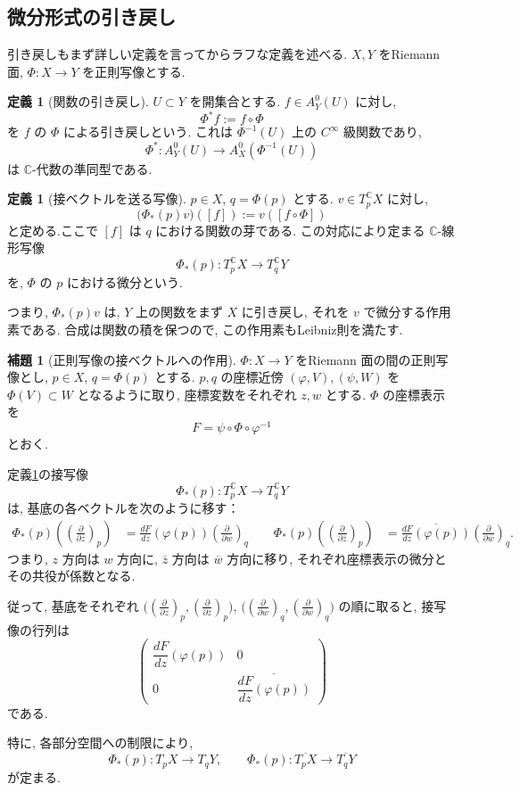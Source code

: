 \documentclass[dvipdfmx,a4paper,11pt]{article} %
\newcommand{\C}{\mathbb{C}}
\theoremstyle{definition}
\numberwithin{equation}{section}
\newtheorem{lem}[thm]{補題}
\newtheorem{dfn}[thm]{定義}
\begin{document}
\subsection{微分形式の引き戻し}\label{O-S022}

引き戻しもまず詳しい定義を言ってからラフな定義を述べる. 
$X,Y$ をRiemann 面, $\Phi:X\to Y$ を正則写像とする.

\begin{dfn}[関数の引き戻し]
$U\subset Y$ を開集合とする.
$f\in A_Y^0(U)$ に対し, 
\[
\Phi^*f:=f\circ\Phi
\]
を $f$ の $\Phi$ による引き戻しという.
これは $\Phi^{-1}(U)$ 上の $C^\infty$ 級関数であり, 
\[
\Phi^*:A_Y^0(U)\longrightarrow A_X^0(\Phi^{-1}(U))
\]
は $\C$-代数の準同型である.
\end{dfn}


\begin{dfn}[接ベクトルを送る写像]\label{dfn-tangent-map}
$p\in X$, $q=\Phi(p)$ とする.
$v\in T_{p}^{\C}X$ に対し, 
\[
\bigl(\Phi_*(p)v\bigr)([f])
:=v([f\circ\Phi])
\]
と定める.ここで $[f]$ は $q$ における関数の芽である.
この対応により定まる $\C$-線形写像
\[
\Phi_*(p):T_{p}^{\C}X\longrightarrow T_{q}^{\C}Y
\]
を, $\Phi$ の $p$ における微分という.
\end{dfn}

つまり, $\Phi_*(p)v$ は, $Y$ 上の関数をまず $X$ に引き戻し, 
それを $v$ で微分する作用素である.
合成は関数の積を保つので, この作用素もLeibniz則を満たす.


\begin{lem}[正則写像の接ベクトルへの作用]\label{O-M106}
$\Phi:X\to Y$ をRiemann 面の間の正則写像とし,
$p\in X$, $q=\Phi(p)$ とする.
$p,q$ の座標近傍 $(\varphi,V),(\psi,W)$ を
$\Phi(V)\subset W$ となるように取り,
座標変数をそれぞれ $z,w$ とする.
$\Phi$ の座標表示を
\[
F=\psi\circ\Phi\circ\varphi^{-1}
\]
とおく.

定義\ref{dfn-tangent-map}の接写像
\[
\Phi_*(p):T_p^\C X\longrightarrow T_q^\C Y
\]
は, 基底の各ベクトルを次のように移す：
\[
\begin{aligned}
\Phi_*(p)\left(\left(\frac{\partial}{\partial z}\right)_p\right)
&=\frac{dF}{dz}(\varphi(p))
  \left(\frac{\partial}{\partial w}\right)_q
  \qquad
\Phi_*(p)\left(\left(\frac{\partial}{\partial\overline z}\right)_p\right)
&=\overline{\frac{dF}{dz}(\varphi(p))}
  \left(\frac{\partial}{\partial\overline w}\right)_q.
\end{aligned}
\]
つまり, $z$ 方向は $w$ 方向に,
$\overline z$ 方向は $\overline w$ 方向に移り,
それぞれ座標表示の微分とその共役が係数となる.

従って, 基底をそれぞれ
$\bigl((\frac{\partial}{\partial z})_p,
(\frac{\partial}{\partial \overline z})_p\bigr)$,
$\bigl((\frac{\partial}{\partial w})_q,
(\frac{\partial}{\partial \overline w})_q\bigr)$
の順に取ると, 接写像の行列は
\[
\begin{pmatrix}
\dfrac{dF}{dz}(\varphi(p))&0\\[6pt]
0&\overline{\dfrac{dF}{dz}(\varphi(p))}
\end{pmatrix}
\]
である.

特に, 各部分空間への制限により,
\[
\Phi_*(p):T_pX\longrightarrow T_qY,\qquad
\Phi_*(p):\overline{T_pX}\longrightarrow\overline{T_qY}
\]
が定まる.
\end{lem}
\end{document}
